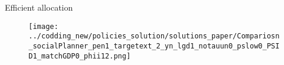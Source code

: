 \documentclass[11pt,aspectratio=169]{beamer}
\begin{document}
\begin{frame}{Efficient allocation}
	
	\begin{figure}
		\begin{minipage}[]{0.45\textwidth}
			\texttt{[image: ../codding\_new/policies\_solution/solutions\_paper/Compariosn\_socialPlanner\_pen1\_targetext\_2\_yn\_lgd1\_notauun0\_pslow0\_PSID1\_matchGDP0\_phii12.png]}
		\end{minipage}
%		
	\end{figure}
	\vspace{4mm}
	\begin{itemize}
		

\end{itemize}
\end{frame}
\end{document}
